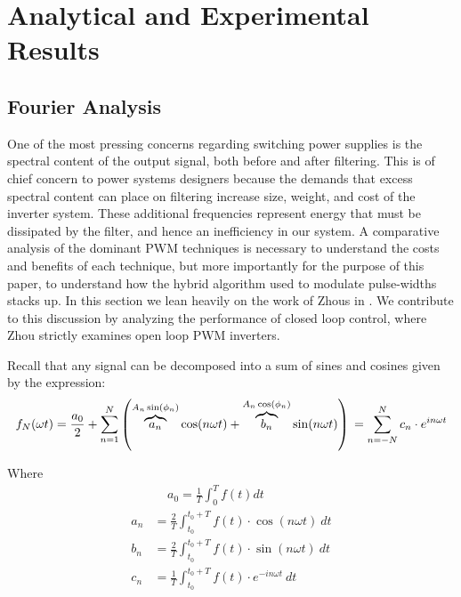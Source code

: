 
\chapter{Analytical and Experimental Results} %

\label{Chapter5} %


\section{Fourier Analysis}
\label{fourier}
One of the most pressing concerns regarding switching power supplies is the spectral content of the output signal, both before and after filtering. This is of chief concern to power systems designers because the demands that excess spectral content can place on filtering increase size, weight, and cost of the inverter system. These additional frequencies represent energy that must be dissipated by the filter, and hence an inefficiency in our system. A comparative analysis of the dominant PWM techniques is necessary to understand the costs and benefits of each technique, but more importantly for the purpose of this paper, to understand how the hybrid algorithm used to modulate pulse-widths stacks up. In this section we lean heavily on the work of Zhous in \cite{fourierAnalysis}. We contribute to this discussion by analyzing the performance of closed loop control, where Zhou strictly examines open loop PWM inverters.

Recall that any signal can be decomposed into a sum of sines and cosines given by the expression:
\begin{equation}
f_N(\omega t) = \frac{a_0}{2} + \sum_{n=1}^N \left(\overbrace{a_n}^{A_n \sin(\phi_n)} \cos(n\omega t) + \overbrace{b_n}^{A_n \cos(\phi_n)} \sin(n\omega t)\right)\\
= \sum_{n=-N}^N c_n\cdot e^{in\omega t}
\end{equation}

Where
\begin{align*}
& ~~~~~ a_0 = \frac{1}{T}\int_{0}^{T}f(t)dt \\
a_n &= \frac{2}{T}\int_{t_0}^{t_0+T} f(t)\cdot  \cos(n\omega t)\ dt \\
b_n &= \frac{2}{T}\int_{t_0}^{t_0+T} f(t)\cdot  \sin(n\omega t)\ dt \\
c_n &= \frac{1}{T}\int_{t_0}^{t_0+T} f(t)\cdot e^{-in\omega t}\ dt
\end{align*}

